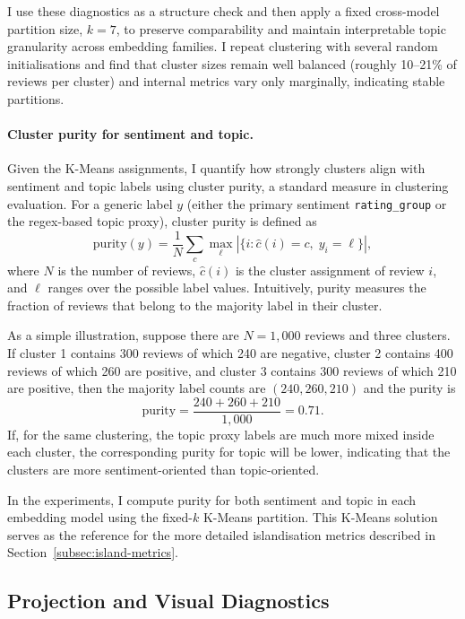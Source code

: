 \documentclass[a4paper,11pt]{article}
\begin{document}
I use these diagnostics as a structure check and then apply a fixed cross-model partition size, $k=7$, to preserve comparability and maintain interpretable topic granularity across embedding families.
I repeat clustering with several random initialisations and find that cluster sizes remain well balanced (roughly 10--21\% of reviews per cluster) and internal metrics vary only marginally, indicating stable partitions.

\paragraph{Cluster purity for sentiment and topic.}

Given the K-Means assignments, I quantify how strongly clusters align with sentiment and topic labels using cluster purity, a standard measure in clustering evaluation. 
For a generic label $y$ (either the primary sentiment \texttt{rating\_group} or the regex-based topic proxy), cluster purity is defined as
\[
\text{purity}(y) = \frac{1}{N} \sum_{c} \max_{\ell} \left| \{ i : \hat{c}(i) = c,\; y_i = \ell \} \right|,
\]
where $N$ is the number of reviews, $\hat{c}(i)$ is the cluster assignment of review $i$, and $\ell$ ranges over the possible label values. 
Intuitively, purity measures the fraction of reviews that belong to the majority label in their cluster.

As a simple illustration, suppose there are $N = 1{,}000$ reviews and three clusters. 
If cluster 1 contains 300 reviews of which 240 are negative, cluster 2 contains 400 reviews of which 260 are positive, and cluster 3 contains 300 reviews of which 210 are positive, then the majority label counts are $(240, 260, 210)$ and the purity is
\[
\text{purity} = \frac{240 + 260 + 210}{1{,}000} = 0.71.
\]
If, for the same clustering, the topic proxy labels are much more mixed inside each cluster, the corresponding purity for topic will be lower, indicating that the clusters are more sentiment-oriented than topic-oriented.

In the experiments, I compute purity for both sentiment and topic in each embedding model using the fixed-$k$ K-Means partition.
This K-Means solution serves as the reference for the more detailed islandisation metrics described in Section~\ref{subsec:island-metrics}.

\subsection{Projection and Visual Diagnostics}
\label{subsec:projection-visual}
\end{document}
